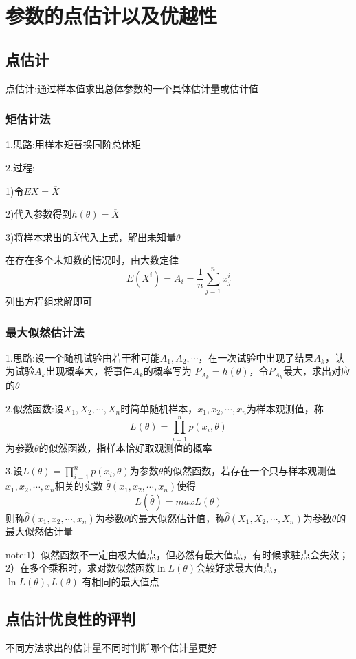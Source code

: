 \documentclass[11pt,twoside,a4paper]{ctexart}
\begin{document}
    
\section{参数的点估计以及优越性}
\subsection{点估计}
点估计:通过样本值求出总体参数的一个具体估计量或估计值
\subsubsection{矩估计法}
1.思路:用样本矩替换同阶总体矩

2.过程:
\begin{minipage}[t]{0.9\linewidth}
    1)令$EX = \overline{X}$

    2)代入参数得到$h(\theta ) = \overline{X}$

    3)将样本求出的$\overline{X}$代入上式，解出未知量$\theta $
    
\end{minipage}

在存在多个未知数的情况时，由大数定律
\[E(X^i) = A_i = \frac{1}{n}\sum _{j=1}^n x_j^i\]
列出方程组求解即可

\subsubsection{最大似然估计法}
1.思路:设一个随机试验由若干种可能$A_1,A_2,\cdots $，在一次试验中出现了结果$A_k$，认为试验$A_k$出现概率大，将事件$A_k$的概率写为
$P_{A_k} = h(\theta )$，令$P_{A_k}$最大，求出对应的$\theta $

2.似然函数:设$X_1,X_2,\cdots , X_n$时简单随机样本，$x_1,x_2,\cdots ,x_n$为样本观测值，称
\[L(\theta ) = \prod _{i=1}^n p(x_i,\theta )\]
为参数$\theta $的似然函数，指样本恰好取观测值的概率

3.设$L(\theta ) = \prod _{i=1}^n p(x_i,\theta )$为参数$\theta $的似然函数，若存在一个只与样本观测值$x_1,x_2,\cdots ,x_n$相关的实数
$\widehat{\theta}(x_1,x_2,\cdots ,x_n) $使得
\[L(\widehat{\theta } )= maxL(\theta )\]
则称$\widehat{\theta}(x_1,x_2,\cdots ,x_n) $为参数$\theta $的最大似然估计值，称$\widehat{\theta}(X_1,X_2,\cdots ,X_n) $为参数$\theta $的最大似然估计量

note:1）似然函数不一定由极大值点，但必然有最大值点，有时候求驻点会失效；2）在多个乘积时，求对数似然函数$\ln L(\theta )$会较好求最大值点，$\ln L(\theta ),L(\theta)$
有相同的最大值点

\subsection{点估计优良性的评判}
不同方法求出的估计量不同时判断哪个估计量更好
\end{document}
